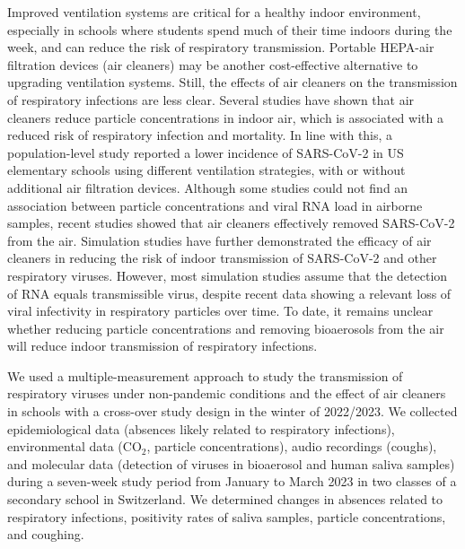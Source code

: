 \documentclass[fleqn,11pt]{wlscirep}
\begin{document}
Improved ventilation systems are critical for a healthy indoor environment, especially in schools where students spend much of their time indoors during the week, and can reduce the risk of respiratory transmission\cite{Wang2021,Morawska2021}. Portable HEPA-air filtration devices (air cleaners) may be another cost-effective alternative to upgrading ventilation systems. Still, the effects of air cleaners on the transmission of respiratory infections are less clear. Several studies have shown that air cleaners reduce particle concentrations in indoor air\cite{Park2020Build,Buising2022InfContr,Banholzer2023PLoSMed}, which is associated with a reduced risk of respiratory infection and mortality\cite{Gordon2014Resp,Kelly2023Atmos,DeAngelis2021EnvRes}. In line with this, a population-level study reported a lower incidence of SARS-CoV-2 in US elementary schools using different ventilation strategies, with or without additional air filtration devices\cite{Gettings2021}. Although some studies could not find an association between particle concentrations and viral RNA load in airborne samples\cite{Nor2021SciRep,Hanna2023PONE}, recent studies showed that air cleaners effectively removed SARS-CoV-2 from the air\cite{Morris2022,Ueki2022mSphere,Myers2022IndoorAir,Rodriguez2021SOTE}. Simulation studies have further demonstrated the efficacy of air cleaners in reducing the risk of indoor transmission of SARS-CoV-2\cite{Lindsley2021} and other respiratory viruses\cite{Cortellessa2023Build}. However, most simulation studies assume that the detection of RNA equals transmissible virus, despite recent data showing a relevant loss of viral infectivity in respiratory particles over time\cite{Oswin2022PNAS}. To date, it remains unclear whether reducing particle concentrations and removing bioaerosols from the air will reduce indoor transmission of respiratory infections. 

We used a multiple-measurement approach to study the transmission of respiratory viruses under non-pandemic conditions and the effect of air cleaners in schools with a cross-over study design in the winter of 2022/2023. We collected epidemiological data (absences likely related to respiratory infections), environmental data (CO$_2$, particle concentrations), audio recordings (coughs), and molecular data (detection of viruses in bioaerosol and human saliva samples) during a seven-week study period from January to March 2023 in two classes of a secondary school in Switzerland. We determined changes in absences related to respiratory infections, positivity rates of saliva samples, particle concentrations, and coughing.
\end{document}
